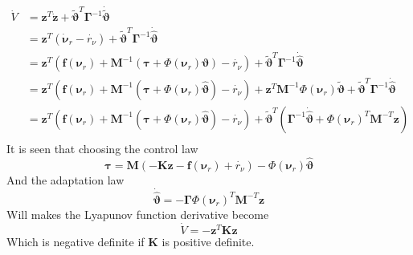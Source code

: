 \documentclass[12pt,a4]{article}
\begin{document}
\begin{align}
	\dot{V} & = \bm{z}^T\dot{\bm{z}}
	+ \bm{\tilde{\vartheta}} ^T\bm{\Gamma}^{-1}\bm{\dot{\tilde{\vartheta}}}                                                                         \\
	        & = \bm{z}^T\left(\bm{\dot{\nu}}_r  - \dot{r_{\nu}}\right)
	+ \bm{\tilde{\vartheta}} ^T\bm{\Gamma}^{-1}\bm{\dot{\hat{\vartheta}}}                                                                           \\
	        & = \bm{z}^T\left(\bm{f}(\bm{\nu}_r) + \bm{M}^{-1}\left(\bm{\tau} + \Phi(\bm{\nu}_r )\bm{\vartheta}\right)  - \dot{r_{\nu}}\right)
	+ \bm{\tilde{\vartheta}} ^T\bm{\Gamma}^{-1}\bm{\dot{\hat{\vartheta}}}                                                                           \\
	        & = \bm{z}^T\left(\bm{f}(\bm{\nu}_r) + \bm{M}^{-1}\left(\bm{\tau} + \Phi(\bm{\nu}_r )\bm{\hat{\vartheta}}\right) - \dot{r_{\nu}}\right)
	+ \bm{z}^T\bm{M}^{-1} \Phi(\bm{\nu}_r )\bm{\tilde{\vartheta}}
	+ \bm{\tilde{\vartheta}} ^T\bm{\Gamma}^{-1}\bm{\dot{\hat{\vartheta}}}                                                                           \\
	        & = \bm{z}^T\left(\bm{f}(\bm{\nu}_r) + \bm{M}^{-1}\left(\bm{\tau} + \Phi(\bm{\nu}_r )\bm{\hat{\vartheta}}\right) - \dot{r_{\nu}}\right)
	+ \bm{\tilde{\vartheta}}^T \left(\bm{\Gamma}^{-1}\bm{\dot{\hat{\vartheta}}} +\Phi(\bm{\nu}_r )^T \bm{M}^{-T} \bm{z} \right)                     \\
\end{align}
It is seen that choosing the control law
\begin{equation}
	\bm{\tau} = \bm{M} \left( -\bm{K}\bm{z} -\bm{f}(\bm{\nu}_r) +\dot{r_{\nu}} \right) -\Phi(\bm{\nu}_r )\bm{\hat{\vartheta}}
\end{equation}
And the adaptation law
\begin{equation}
	\bm{\dot{\hat{\vartheta}}} = - \bm{\Gamma} \Phi(\bm{\nu}_r )^T \bm{M}^{-T} \bm{z}
\end{equation}
Will makes the Lyapunov function derivative become
\begin{equation}
	\dot{V} = -\bm{z}^T \bm{K} \bm{z}
\end{equation}
Which is negative definite if $\bm{K}$ is positive definite.
\end{document}
